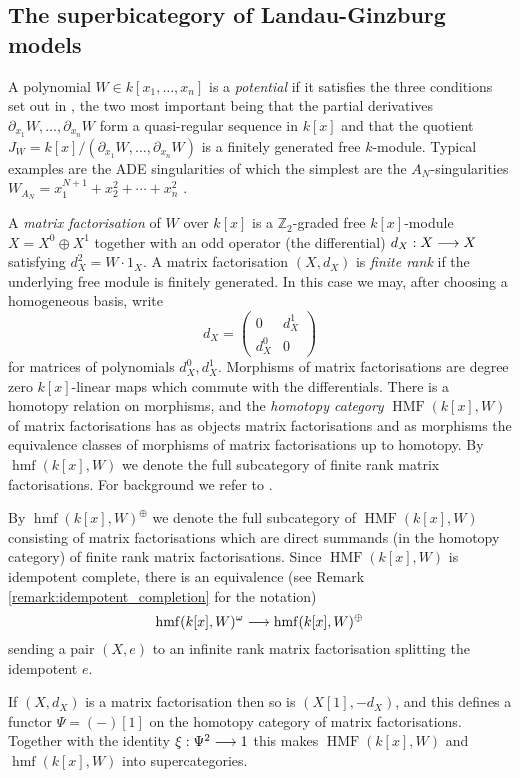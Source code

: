 \documentclass[english,letter paper,12pt,leqno]{article}
\theoremstyle{example}
\numberwithin{equation}{section}
\def\be{\begin{equation}}
\def\ee{\end{equation}}
\DeclareMathOperator{\hmf}{hmf}
\DeclareMathOperator{\HMF}{HMF}
\begin{document}
\subsection{The superbicategory of Landau-Ginzburg models}\label{section:superbicatLG}

A polynomial $W \in k[x_1,\ldots,x_n]$ is a \emph{potential} if it satisfies the three conditions set out in \cite[Section 2.2]{lgdual}, the two most important being that the partial derivatives $\partial_{x_1} W, \ldots, \partial_{x_n} W$ form a quasi-regular sequence in $k[x]$ and that the quotient $J_W = k[x]/(\partial_{x_1} W, \ldots, \partial_{x_n} W)$ is a finitely generated free $k$-module. Typical examples are the ADE singularities \cite[I \S 2.4]{greuel} of which the simplest are the $A_N$-singularities $W_{A_N} = x_1^{N+1} + x_2^2 + \cdots + x_n^2$ .

A \emph{matrix factorisation} of $W$ over $k[x]$ is a $\mathbb{Z}_2$-graded free $k[x]$-module $X = X^0 \oplus X^1$ together with an odd operator (the differential) $d_X: X \longrightarrow X$ satisfying $d_X^2 = W \cdot 1_X$. A matrix factorisation $(X,d_X)$ is \emph{finite rank} if the underlying free module is finitely generated. In this case we may, after choosing a homogeneous basis, write
\[
d_X = \begin{pmatrix} 0 & d_X^1 \\ d_X^0 & 0 \end{pmatrix}
\]
for matrices of polynomials $d_X^0, d_X^1$. Morphisms of matrix factorisations are degree zero $k[x]$-linear maps which commute with the differentials. There is a homotopy relation on morphisms, and the \emph{homotopy category} $\HMF(k[x],W)$ of matrix factorisations has as objects matrix factorisations and as morphisms the equivalence classes of morphisms of matrix factorisations up to homotopy. By $\hmf(k[x],W)$ we denote the full subcategory of finite rank matrix factorisations. For background we refer to \cite{yoshino98}.

By $\hmf(k[x],W)^{\oplus}$ we denote the full subcategory of $\HMF(k[x],W)$ consisting of matrix factorisations which are direct summands (in the homotopy category) of finite rank matrix factorisations. Since $\HMF(k[x],W)$ is idempotent complete, there is an equivalence (see Remark \ref{remark:idempotent_completion} for the notation)
\be\label{eq:omegavsoplus}
\hmf(k[x],W)^\omega \lto \hmf(k[x],W)^{\oplus}
\ee
sending a pair $(X,e)$ to an infinite rank matrix factorisation splitting the idempotent $e$.

If $(X,d_X)$ is a matrix factorisation then so is $(X[1], -d_X)$, and this defines a functor $\Psi = (-)[1]$ on the homotopy category of matrix factorisations. Together with the identity $\xi: \Psi^2 \longrightarrow 1$ this makes $\HMF(k[x],W)$ and $\hmf(k[x],W)$ into supercategories.
\end{document}

